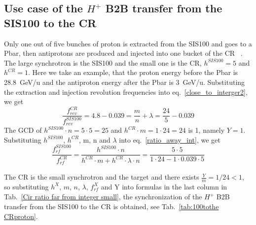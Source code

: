 \subsection{Use case of the $H^{+}$ B2B transfer from the SIS100 to the CR} 
Only one out of five bunches of proton is extracted from the SIS100 and goes to a Pbar, then antiprotons are produced and injected into one bucket of the CR ~\cite{steck_demonstration_2011}. The large synchrotron is the SIS100 and the small one is the CR, $h^{\mathit{SIS100}}=5$ and $h^{\mathit{CR}}=1$. Here we take an example, that the proton energy before the Pbar is \SI{28.8}{GeV/\atomicmassunit} and the antiproton energy after the Pbar is \SI{3}{GeV/\atomicmassunit}. Substituting the extraction and injection revolution frequencies into eq.~\ref{close_to_interger2}, we get
\begin{equation} 
\frac{f_{\mathit{rev}}^{\mathit{CR}}}{f_{\mathit{rev}}^{\mathit{SIS100}}}=4.8-0.039=\frac{m}{n}+ \lambda=\frac{24}{5}-0.039
\end{equation}
The GCD of $h^{\mathit{SIS100}}\cdot n=5\cdot5=25$ and $h^{\mathit{CR}} \cdot m=1\cdot 24=24$ is 1, namely $Y=1$. Substituting $h^{\mathit{SIS100}}$, $h^{\mathit{CR}}$, m, n and $\lambda$ into eq.~\ref{ratio_away_int}, we get
\begin{equation} 
\frac{f_{\mathit{rf}}^{\mathit{SIS100}}}{f_{\mathit{rf}}^{\mathit{CR}}}=\frac{h^{\mathit{SIS100}}\cdot n}{h^{\mathit{CR}} \cdot m+ h^{\mathit{CR}} \cdot\lambda\cdot n}=\frac{5\cdot 5}{1 \cdot 24- 1 \cdot0.039\cdot 5}
\end{equation}

The CR is the small synchrotron and the target and there exists $\frac{Y}{m}=1/24<1$, so substituting $h^X$, $m$, $n$, $\lambda$, $f_{\mathit{rf}}^{X}$ and Y into formulas in the last column in Tab.~\ref{Cir ratio far from integer small}, the synchronization of the $H^{+}$ B2B transfer from the SIS100 to the CR is obtained, see Tab.~\ref{tab:100tothe CRproton}.

